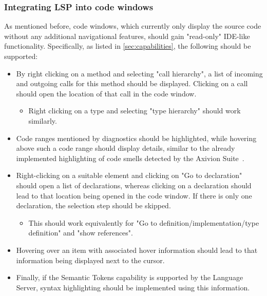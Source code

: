 \documentclass{scrartcl}
\begin{document}
{\subsubsection{Integrating LSP into code windows}\label{subsubsec:window}
As mentioned before, code windows, which currently only display the source code without any additional navigational features, should gain "read-only" IDE-like functionality.
Specifically, as listed in \autoref{sec:capabilities}, the following should be supported:
\begin{itemize}
  \item By right clicking on a method and selecting "call hierarchy", a list of incoming and outgoing calls for this method should be displayed.
    Clicking on a call should open the location of that call in the code window.
    \begin{itemize}
      \item Right clicking on a type and selecting "type hierarchy" should work similarly.
    \end{itemize}
  \item Code ranges mentioned by diagnostics should be highlighted, while hovering above such a code range should display details, similar to the already implemented highlighting of code smells detected by the Axivion Suite~\cite{falko}.
  \item Right-clicking on a suitable element and clicking on "Go to declaration" should open a list of declarations, whereas clicking on a declaration should lead to that location being opened in the code window.
    If there is only one declaration, the selection step should be skipped.
    \begin{itemize}
      \item This should work equivalently for "Go to definition/implementation/type definition" and "show references".
    \end{itemize}
  \item Hovering over an item with associated hover information should lead to that information being displayed next to the cursor.
  \item Finally, if the Semantic Tokens capability is supported by the Language Server, syntax highlighting should be implemented using this information.
\end{itemize}

}
\end{document}
